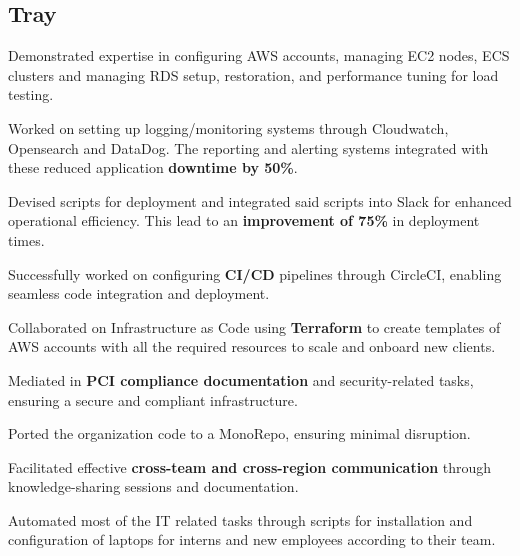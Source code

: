 \documentclass[]{plushcv}
\begin{document}
\begin{minipage}[t]{0.8\textwidth}
\subsection{Tray}
\vspace{\topsep}
\begin{tightemize}
\sectionsep 
\item[\textbullet{}] Demonstrated expertise in configuring AWS accounts, managing EC2 nodes, ECS clusters and managing RDS setup, restoration, and performance tuning for load testing.
\item[\textbullet{}] Worked on setting up logging/monitoring systems through Cloudwatch, Opensearch and DataDog. The reporting and alerting systems integrated with these reduced application \textbf{downtime by 50\%}.
\item[\textbullet{}] Devised scripts for deployment and integrated said scripts into Slack for enhanced operational efficiency. This lead to an \textbf{improvement of 75\%} in deployment times.
\item[\textbullet{}]  Successfully worked on configuring \textbf{CI/CD} pipelines through CircleCI, enabling seamless code integration and deployment. 
\item[\textbullet{}] Collaborated on Infrastructure as Code using \textbf{Terraform} to create templates of AWS accounts with all the required resources to scale and onboard new clients.
\item[\textbullet{}] Mediated in \textbf{PCI compliance documentation} and security-related tasks, ensuring a secure and compliant infrastructure.
\item[\textbullet{}] Ported the organization code to a MonoRepo, ensuring minimal disruption.
\item[\textbullet{}]  Facilitated effective \textbf{cross-team and cross-region communication} through knowledge-sharing sessions and documentation.
\item[\textbullet{}] Automated most of the IT related tasks through scripts for installation and configuration of laptops for interns and new employees according to their team.
\end{tightemize}
\sectionsep


\end{minipage}
\end{document}
